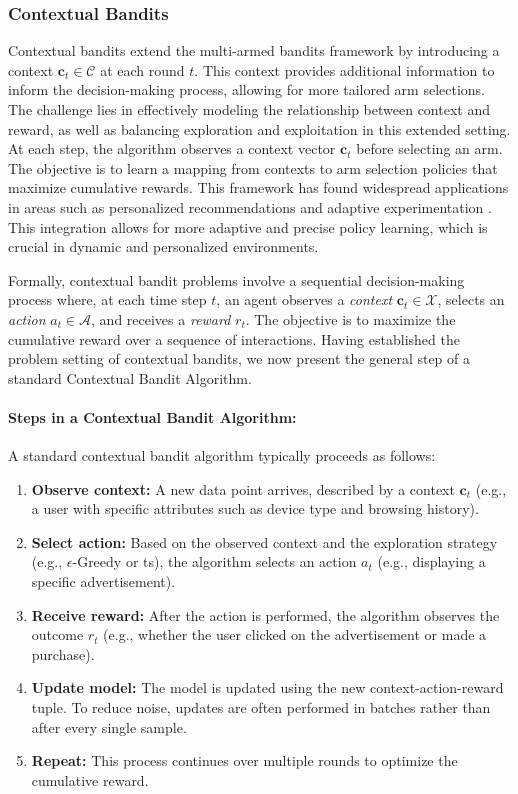 \subsubsection{Contextual Bandits}
Contextual bandits extend the multi-armed bandits framework by introducing a context $\mathbf{c}_t \in \mathcal{C}$ at each round $t$. This context provides additional information to inform the decision-making process, allowing for more tailored arm selections. The challenge lies in effectively modeling the relationship between context and reward, as well as balancing exploration and exploitation in this extended setting. At each step, the algorithm observes a context vector $\mathbf{c}_t$ before selecting an arm. The objective is to learn a mapping from contexts to arm selection policies that maximize cumulative rewards. This framework has found widespread applications in areas such as personalized recommendations and adaptive experimentation \citep{li2010contextual}. This integration allows for more adaptive and precise policy learning, which is crucial in dynamic and personalized environments.
 
Formally, contextual bandit problems involve a sequential decision-making process where, at each time step $t$, an agent observes a \textit{context} $\mathbf{c}_t \in \mathcal{X}$, selects an \textit{action} $a_t \in \mathcal{A}$, and receives a \textit{reward} $r_t$. The objective is to maximize the cumulative reward over a sequence of interactions.  Having established the problem setting of contextual bandits, we now present the general step of a standard Contextual Bandit Algorithm.

\paragraph{Steps in a Contextual Bandit Algorithm:}
A standard contextual bandit algorithm typically proceeds as follows:
\begin{enumerate}
    \item \textbf{Observe context:} A new data point arrives, described by a context $\mathbf{c}_t$ (e.g., a user with specific attributes such as device type and browsing history).
    \item \textbf{Select action:} Based on the observed context and the exploration strategy (e.g., $\epsilon$-Greedy or \ac{ts}), the algorithm selects an action $a_t$ (e.g., displaying a specific advertisement).
    \item \textbf{Receive reward:} After the action is performed, the algorithm observes the outcome $r_t$ (e.g., whether the user clicked on the advertisement or made a purchase).
    \item \textbf{Update model:} The model is updated using the new context-action-reward tuple. To reduce noise, updates are often performed in batches rather than after every single sample.
    \item \textbf{Repeat:} This process continues over multiple rounds to optimize the cumulative reward.
\end{enumerate}

